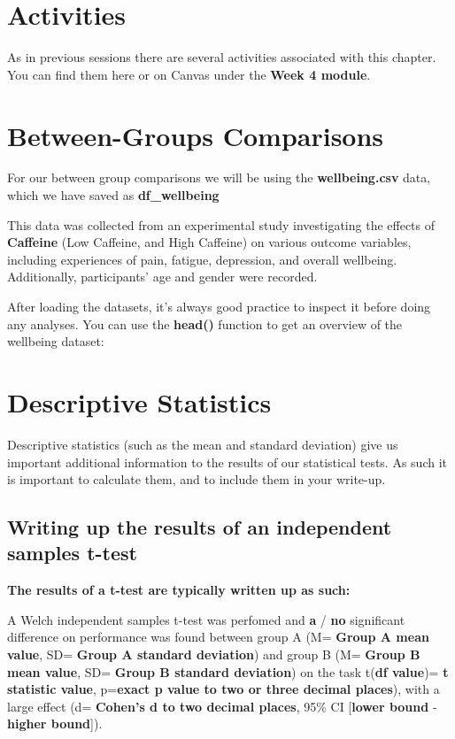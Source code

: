 \documentclass[
]{book}
\begin{document}
\section{Activities}\label{activities-2}

As in previous sessions there are several activities associated with this chapter. You can find them here or on Canvas under the \textbf{Week 4 module}.

\section{Between-Groups Comparisons}\label{between-groups-comparisons}

For our between group comparisons we will be using the \textbf{wellbeing.csv} data, which we have saved as \textbf{df\_wellbeing}

This data was collected from an experimental study investigating the effects of \textbf{Caffeine} (Low Caffeine, and High Caffeine) on various outcome variables, including experiences of pain, fatigue, depression, and overall wellbeing. Additionally, participants' age and gender were recorded.

After loading the datasets, it's always good practice to inspect it before doing any analyses. You can use the \textbf{head()} function to get an overview of the wellbeing dataset:

\section{Descriptive Statistics}\label{descriptive-statistics}

Descriptive statistics (such as the mean and standard deviation) give us important additional information to the results of our statistical tests. As such it is important to calculate them, and to include them in your write-up.

\subsection{Writing up the results of an independent samples t-test}\label{writing-up-the-results-of-an-independent-samples-t-test}

\textbf{The results of a t-test are typically written up as such:}

A Welch independent samples t-test was perfomed and \textbf{a} / \textbf{no} significant difference on performance was found between group A (M= \textbf{Group A mean value}, SD= \textbf{Group A standard deviation}) and group B (M= \textbf{Group B mean value}, SD= \textbf{Group B standard deviation}) on the task t(\textbf{df value})= \textbf{t statistic value}, p=\textbf{exact p value to two or three decimal places}), with a large effect (d= \textbf{Cohen's d to two decimal places}, 95\% CI {[}\textbf{lower bound} ‐ \textbf{higher bound}{]}).
\end{document}
